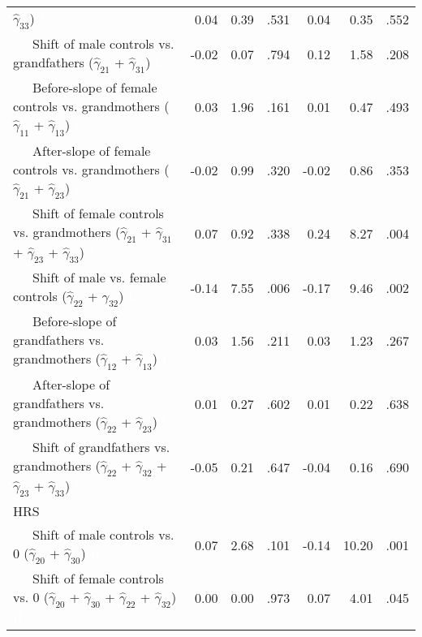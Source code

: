 \documentclass[
  english,
  man, noextraspace]{apa7}
\newenvironment{lltable}{\begin{landscape}\begin{center}\begin{ThreePartTable}}{\end{ThreePartTable}\end{center}\end{landscape}}
\begin{document}
\begin{lltable}
{\begin{longtable}{lrrrrrr}
                              $\hat{\gamma}_{33}$) \textcolor{white}{L} & 0.04 & 0.39 & .531 & 0.04 & 0.35 & .552\\
\ \ \ Shift of male controls vs. grandfathers 
                              ($\hat{\gamma}_{21}$ + $\hat{\gamma}_{31}$) \textcolor{white}{L} & -0.02 & 0.07 & .794 & 0.12 & 1.58 & .208\\
\ \ \ Before-slope of female controls vs. grandmothers 
                              ($\hat{\gamma}_{11}$ + $\hat{\gamma}_{13}$) \textcolor{white}{L} & 0.03 & 1.96 & .161 & 0.01 & 0.47 & .493\\
\ \ \ After-slope of female controls vs. grandmothers 
                              ($\hat{\gamma}_{21}$ + $\hat{\gamma}_{23}$) \textcolor{white}{L} & -0.02 & 0.99 & .320 & -0.02 & 0.86 & .353\\
\ \ \ Shift of female controls vs. grandmothers 
                              ($\hat{\gamma}_{21}$ + $\hat{\gamma}_{31}$ + 
                              $\hat{\gamma}_{23}$ + $\hat{\gamma}_{33}$) \textcolor{white}{L} & 0.07 & 0.92 & .338 & 0.24 & 8.27 & .004\\
\ \ \ Shift of male vs. female controls 
                              ($\hat{\gamma}_{22}$ + $\hat{\gamma}_{32}$) \textcolor{white}{L} & -0.14 & 7.55 & .006 & -0.17 & 9.46 & .002\\
\ \ \ Before-slope of grandfathers vs. grandmothers 
                              ($\hat{\gamma}_{12}$ + $\hat{\gamma}_{13}$) \textcolor{white}{L} & 0.03 & 1.56 & .211 & 0.03 & 1.23 & .267\\
\ \ \ After-slope of grandfathers vs. grandmothers 
                              ($\hat{\gamma}_{22}$ + $\hat{\gamma}_{23}$) \textcolor{white}{L} & 0.01 & 0.27 & .602 & 0.01 & 0.22 & .638\\
\ \ \ Shift of grandfathers vs. grandmothers 
                              ($\hat{\gamma}_{22}$ + $\hat{\gamma}_{32}$ + 
                              $\hat{\gamma}_{23}$ + $\hat{\gamma}_{33}$) \textcolor{white}{L} & -0.05 & 0.21 & .647 & -0.04 & 0.16 & .690\\
HRS &  &  &  &  &  & \\
\ \ \ Shift of male controls vs. 0 ($\hat{\gamma}_{20}$ + 
                              $\hat{\gamma}_{30}$) \textcolor{white}{H} & 0.07 & 2.68 & .101 & -0.14 & 10.20 & .001\\
\ \ \ Shift of female controls vs. 0 ($\hat{\gamma}_{20}$ + 
                              $\hat{\gamma}_{30}$ + $\hat{\gamma}_{22}$ + 
                              $\hat{\gamma}_{32}$) \textcolor{white}{H} & 0.00 & 0.00 & .973 & 0.07 & 4.01 & .045\\

\end{longtable}}
\end{lltable}
\end{document}
